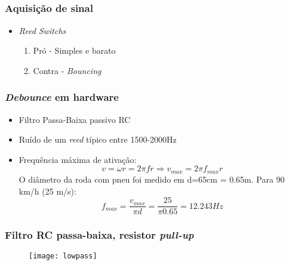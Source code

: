 \documentclass{beamer}
\begin{document}
\subsection{}
\begin{frame}
  \frametitle{Aquisição de sinal}
  \begin{itemize}
    \item \textit{Reed Switchs}
    \begin{enumerate}
      \item Pró - Simples e barato
      \item Contra - \textit{Bouncing}
    \end{enumerate}
  \end{itemize}

\begin{figure}[h!]
 \centering
   \hfil
  \label{fig:reed}
\end{figure}
\end{frame}

\begin{frame}
 \frametitle{\textit{Debounce} em hardware}
  \begin{itemize}
    \item Filtro Passa-Baixa passivo RC
    \item Ruído de um \textit{reed} típico entre 1500-2000Hz
    \item Frequência máxima de ativação:
    \begin{equation}
  v = \omega r = 2\pi f r \Rightarrow v_{max} = 2\pi f_{max} r
\end{equation}
O diâmetro da roda com pneu foi medido em d=65cm = 0.65m. Para 90
km/h (25 m/s):
\begin{equation}
  f_{max} = \frac{\displaystyle v_{max}}{\displaystyle \pi d} =
\frac{\displaystyle 25}{\displaystyle \pi 0.65} = 12.243 Hz
\end{equation}

  \end{itemize}
\end{frame}

\begin{frame}
  \frametitle{Filtro RC passa-baixa, resistor \textit{pull-up}}
  \begin{center}
    \begin{figure}
        \texttt{[image: lowpass]}
    \end{figure}
  \end{center}
\end{frame}
\end{document}
